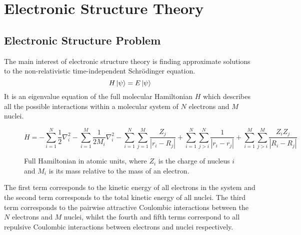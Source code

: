 \section{Electronic Structure Theory}

\subsection{Electronic Structure Problem}
The main interest of electronic structure theory is finding approximate solutions to the non-relativistic time-independent Schrödinger equation.
\begin{equation*}
    H\ket\psi = E\ket\psi
\end{equation*}
It is an eigenvalue equation of the full molecular Hamiltonian $H$ which describes all the possible interactions within a molecular system of $N$ electrons and $M$ nuclei.
\begin{figure}[H]
\centering
\begin{equation*}
    H =
    - \sum_{i=1}^{N} \frac{1}{2} \nabla^{2}_{i}
    - \sum_{i=1}^{M} \frac{1}{2M_i} \nabla^{2}_{i}
    - \sum_{i=1}^{N} \sum_{j=1}^{M} \frac{Z_j}{|r_{i} - R_{j}|}
    + \sum_{i=1}^{N} \sum_{j>i}^{N} \frac{1}{|r_{i} - r_{j}|}
    + \sum_{i=1}^{M} \sum_{j>i}^{M} \frac{Z_{i} Z_{j}}{|R_{i} - R_{j}|}
\end{equation*}
\caption{Full Hamiltonian in atomic units, where $Z_i$ is the charge of nucleus $i$ and $M_i$ is its mass relative to the mass of an electron.}
\end{figure}

The first term corresponds to the kinetic energy of all electrons in the system and the second term corresponds to the total kinetic energy of all nuclei. The third term corresponds to the pairwise attractive Coulombic interactions between the $N$ electrons and $M$ nuclei, whilst the fourth and fifth terms correspond to all repulsive Coulombic interactions between electrons and nuclei respectively.

